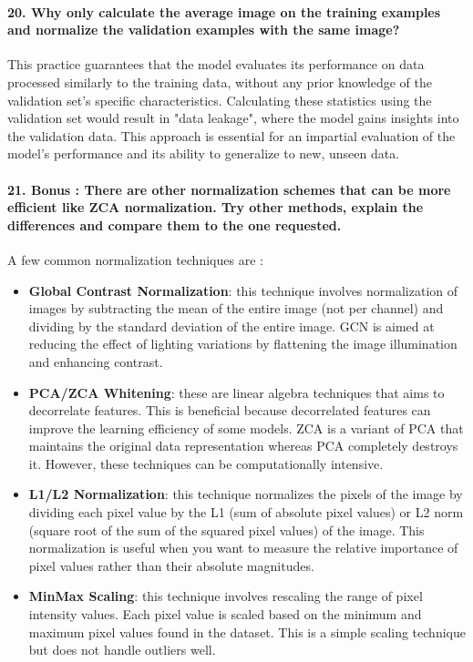 \documentclass{article}
\theoremstyle{plain}%
\theoremstyle{definition}
\theoremstyle{remark}
\begin{document}
\paragraph{20. Why only calculate the average image on the training examples and normalize the validation examples with the same image?}
This practice guarantees that the model evaluates its performance on data processed similarly to the training data, without any prior knowledge of the validation set's specific characteristics. Calculating these statistics using the validation set would result in "data leakage", where the model gains insights into the validation data. This approach is essential for an impartial evaluation of the model's performance and its ability to generalize to new, unseen data.

\paragraph{21. Bonus : There are other normalization schemes that can be more efficient like ZCA normalization. Try other methods, explain the differences and compare them to the one requested.}

A few common normalization techniques are :

\begin{itemize}
    \item \textbf{Global Contrast Normalization}: this technique involves normalization of images by subtracting the mean of the entire image (not per channel) and dividing by the standard deviation of the entire image. GCN is aimed at reducing the effect of lighting variations by flattening the image illumination and enhancing contrast.
    \item \textbf{PCA/ZCA Whitening}: these are linear algebra techniques that aims to decorrelate features. This is beneficial because decorrelated features can improve the learning efficiency of some models. ZCA is a variant of PCA that maintains the original data representation whereas PCA completely destroys it. However, these techniques can be computationally intensive.
    \item \textbf{L1/L2 Normalization}: this technique normalizes the pixels of the image by dividing each pixel value by the L1 (sum of absolute pixel values) or L2 norm (square root of the sum of the squared pixel values) of the image. This normalization is useful when you want to measure the relative importance of pixel values rather than their absolute magnitudes.
    \item \textbf{MinMax Scaling}: this technique involves rescaling the range of pixel intensity values. Each pixel value is scaled based on the minimum and maximum pixel values found in the dataset. This is a simple scaling technique but does not handle outliers well.
\end{itemize}
\end{document}
